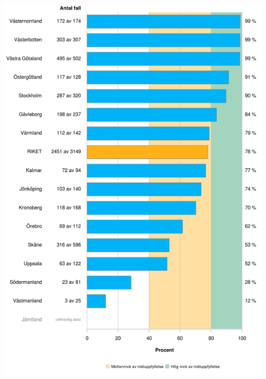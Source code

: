 \documentclass[10pt, a4paper,twoside]{report}
\begin{document}
\includegraphics[]{figurer/Jamforelse1}
\end{document}
